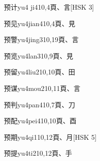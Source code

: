 \begin{EntryWithPhonetic}{预计}{yu4 ji4}{10,4}{⾴、⾔}[HSK 3]
\end{EntryWithPhonetic}

\begin{EntryWithPhonetic}{预见}{yu4jian4}{10,4}{⾴、⾒}
\end{EntryWithPhonetic}

\begin{EntryWithPhonetic}{预警}{yu4jing3}{10,19}{⾴、⾔}
\end{EntryWithPhonetic}

\begin{EntryWithPhonetic}{预览}{yu4lan3}{10,9}{⾴、⾒}
\end{EntryWithPhonetic}

\begin{EntryWithPhonetic}{预留}{yu4liu2}{10,10}{⾴、⽥}
\end{EntryWithPhonetic}

\begin{EntryWithPhonetic}{预谋}{yu4mou2}{10,11}{⾴、⾔}
\end{EntryWithPhonetic}

\begin{EntryWithPhonetic}{预判}{yu4pan4}{10,7}{⾴、⼑}
\end{EntryWithPhonetic}

\begin{EntryWithPhonetic}{预配}{yu4pei4}{10,10}{⾴、⾣}
\end{EntryWithPhonetic}

\begin{EntryWithPhonetic}{预期}{yu4qi1}{10,12}{⾴、⽉}[HSK 5]
\end{EntryWithPhonetic}

\begin{EntryWithPhonetic}{预提}{yu4ti2}{10,12}{⾴、⼿}
\end{EntryWithPhonetic}

